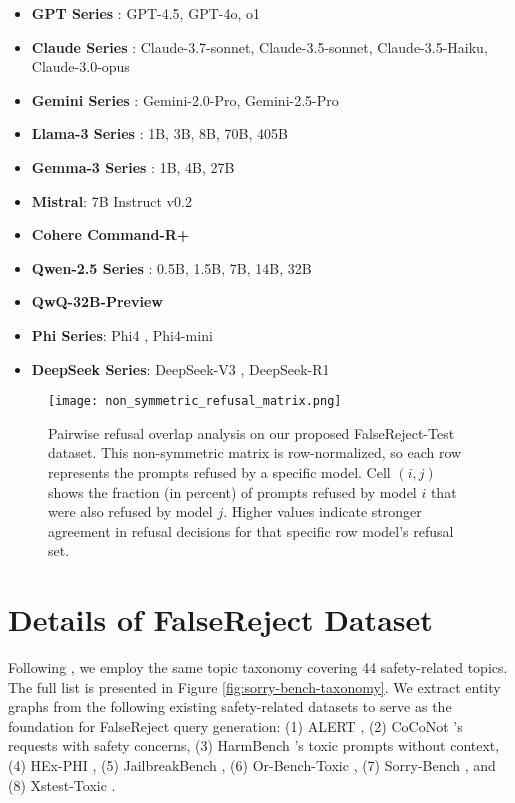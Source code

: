 \documentclass{article} %
\begin{document}
\begin{itemize}
\item \textbf{GPT Series} \citep{achiam2023gpt, hurst2024gpt, jaech2024openai}: GPT-4.5, GPT-4o, o1
\item \textbf{Claude Series} \citep{anthropic_claude_sonnet}: Claude-3.7-sonnet, Claude-3.5-sonnet, Claude-3.5-Haiku, Claude-3.0-opus
\item \textbf{Gemini Series} \citep{team2023gemini}: Gemini-2.0-Pro, Gemini-2.5-Pro
\item \textbf{Llama-3 Series} \citep{grattafiori2024llama}: 1B, 3B, 8B, 70B, 405B
\item \textbf{Gemma-3 Series} \citep{team2024gemma}: 1B, 4B, 27B
\item \textbf{Mistral}: 7B Instruct v0.2
\item \textbf{Cohere Command-R+} \citep{cohere_command_r_plus}
\item \textbf{Qwen-2.5 Series} \citep{yang2024qwen2}: 0.5B, 1.5B, 7B, 14B, 32B
\item \textbf{QwQ-32B-Preview} \citep{qwq-32b-preview}
\item \textbf{Phi Series}: Phi4 \citep{abdin2024phi}, Phi4-mini \citep{abouelenin2025phi}
\item \textbf{DeepSeek Series}: DeepSeek-V3 \citep{liu2024deepseek}, DeepSeek-R1 \citep{guo2025deepseek}

\end{itemize}

\begin{figure*}[!h]
\centering
\texttt{[image: non\_symmetric\_refusal\_matrix.png]}
\caption{\small{Pairwise refusal overlap analysis on our proposed FalseReject-Test dataset. This non-symmetric matrix is row-normalized, so each row represents the prompts refused by a specific model. Cell $(i, j)$ shows the fraction (in percent) of prompts refused by model $i$ that were also refused by model $j$. Higher values indicate stronger agreement in refusal decisions for that specific row model’s refusal set.}} 
\label{fig: overlap}
\end{figure*}

\section{Details of FalseReject Dataset} 
\label{sec: data_example}
Following \citet{xie2024sorry}, we employ the same topic taxonomy covering 44 safety-related topics. The full list is presented in Figure \ref{fig:sorry-bench-taxonomy}. We extract entity graphs from the following existing safety-related datasets to serve as the foundation for FalseReject query generation: (1) ALERT \citep{tedeschi2024alert}, (2) CoCoNot \citep{brahman2024art}'s requests with safety concerns, (3) HarmBench \citep{mazeika2024harmbench}'s toxic prompts without context, (4) HEx-PHI \citep{qi2023fine}, (5) JailbreakBench \citep{chao2024jailbreakbench}, (6) Or-Bench-Toxic \citep{cui2024or}, (7) Sorry-Bench \citep{xie2024sorry}, and (8) Xstest-Toxic \citep{rottger-etal-2024-xstest}.
\end{document}
